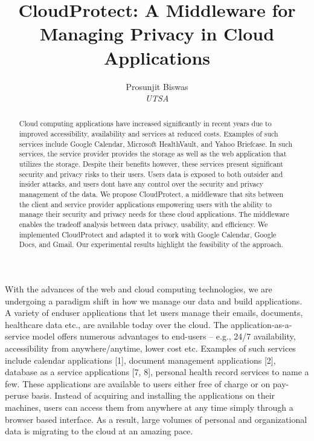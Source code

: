 \documentclass[11pt,onecolumn]{article}
\begin{document}
%
\title{CloudProtect: A Middleware for Managing Privacy in Cloud Applications}



\author{
 Prosunjit Biswas\\
 \textit{UTSA}
}


\maketitle


\begin{abstract}
Cloud computing applications have increased significantly in recent years due to improved
accessibility, availability and services at reduced costs. Examples of such
services include Google Calendar, Microsoft HealthVault, and Yahoo Briefcase. In
such services, the service provider provides the storage as well as the web application
that utilizes the storage. Despite their benefits however, these services present
significant security and privacy risks to their users. Users data is exposed to both
outsider and insider attacks, and users dont have any control over the security and
privacy management of the data. We propose CloudProtect, a middleware that sits
between the client and service provider applications empowering users with the ability
to manage their security and privacy needs for these cloud applications. The middleware
enables the tradeoff analysis between data privacy, usability, and efficiency.
We implemented CloudProtect and adapted it to work with Google Calendar, Google
Docs, and Gmail. Our experimental results highlight the feasibility of the approach.
\end{abstract}



With the advances of the web and cloud computing technologies, we are undergoing a
paradigm shift in how we manage our data and build applications. A variety of enduser
applications that let users manage their emails, documents, healthcare data etc.,
are available today over the cloud. The application-as-a-service model offers numerous
advantages to end-users – e.g., 24/7 availability, accessibility from anywhere/anytime,
lower cost etc. Examples of such services include calendar applications [1],
document management applications [2], database as a service applications
[7, 8], personal health record services to name a few. These applications are
available to users either free of charge or on pay-peruse basis. Instead of acquiring and
installing the applications on their machines, users can access them from anywhere
at any time simply through a browser based interface. As a result, large volumes of
personal and organizational data is migrating to the cloud at an amazing pace.
\end{document}
